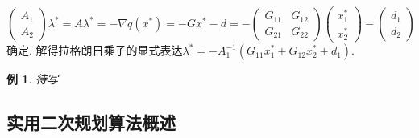 \documentclass{SBCbookchapter}
\newtheorem{eg}[thm]{例}
\begin{document}
\begin{equation*}
\begin{pmatrix} A_1 \\ A_2 \end{pmatrix} \lambda^* = A \lambda^* = -\nabla q(x^*) = - G x^* - d = - \begin{pmatrix} G_{11} & G_{12} \\ G_{21} & G_{22} \end{pmatrix} \begin{pmatrix} x_1^* \\ x_2^* \end{pmatrix} - \begin{pmatrix} d_1 \\ d_2 \end{pmatrix}
\end{equation*}
确定. 解得拉格朗日乘子的显式表达$\lambda^* = -A_1^{-1} \left( G_{11}x_1^* + G_{12}x_2^* + d_1 \right).$

\begin{eg}
\label{eg:7.2.1}
待写
\end{eg}


\subsection{实用二次规划算法概述}
\label{subsec:7.2.2}



\end{document}
